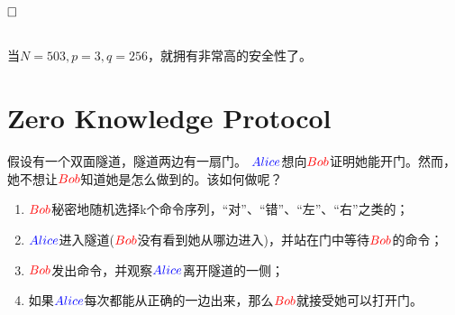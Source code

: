\documentclass{article}
\theoremstyle{definition}
\begin{document}
$\hfill\square$ 

~\\

当$N = 503,p = 3, q = 256$，就拥有非常高的安全性了。

\section{Zero Knowledge Protocol}

假设有一个双面隧道，隧道两边有一扇门。
${\color{blue}Alice}$想向${\color{red}Bob}$证明她能开门。然而，她不想让${\color{red}Bob}$知道她是怎么做到的。该如何做呢？

\begin{enumerate}
\item ${\color{red}Bob}$秘密地随机选择k个命令序列，“对”、“错”、“左”、“右”之类的；
\item ${\color{blue}Alice}$进入隧道(${\color{red}Bob}$没有看到她从哪边进入)，并站在门中等待${\color{red}Bob}$的命令；
\item ${\color{red}Bob}$发出命令，并观察${\color{blue}Alice}$离开隧道的一侧；
\item 如果${\color{blue}Alice}$每次都能从正确的一边出来，那么${\color{red}Bob}$就接受她可以打开门。
\end{enumerate}
\end{document}
